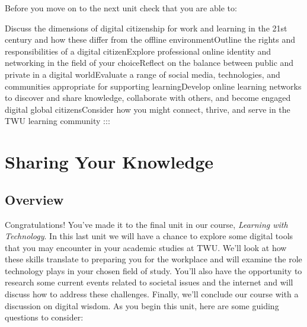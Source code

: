 \documentclass[
  letterpaper,
  DIV=11,
  numbers=noendperiod]{scrreprt}
\begin{document}
\begin{tcolorbox}[enhanced jigsaw, toprule=.15mm, colback=white, colframe=quarto-callout-note-color-frame, bottomtitle=1mm, leftrule=.75mm, coltitle=black, titlerule=0mm, rightrule=.15mm, colbacktitle=quarto-callout-note-color!10!white, left=2mm, title={Checking Your Learning}, opacitybacktitle=0.6, opacityback=0, breakable, toptitle=1mm, arc=.35mm, bottomrule=.15mm]

Before you move on to the next unit check that you are able to:

Discuss the dimensions of digital citizenship for work and learning in
the 21st century and how these differ from the offline
environmentOutline the rights and responsibilities of a digital
citizenExplore professional online identity and networking in the field
of your choiceReflect on the balance between public and private in a
digital worldEvaluate a range of social media, technologies, and
communities appropriate for supporting learningDevelop online learning
networks to discover and share knowledge, collaborate with others, and
become engaged digital global citizensConsider how you might connect,
thrive, and serve in the TWU learning community :::

\end{tcolorbox}


\chapter{Sharing Your Knowledge}\label{sharing-your-knowledge}

\section*{Overview}\label{overview-5}


Congratulations! You've made it to the final unit in our course,
\emph{Learning with Technology}. In this last unit we will have a chance
to explore some digital tools that you may encounter in your academic
studies at TWU. We'll look at how these skills translate to preparing
you for the workplace and will examine the role technology plays in your
chosen field of study. You'll also have the opportunity to research some
current events related to societal issues and the internet and will
discuss how to address these challenges. Finally, we'll conclude our
course with a discussion on digital wisdom. As you begin this unit, here
are some guiding questions to consider:
\end{document}
